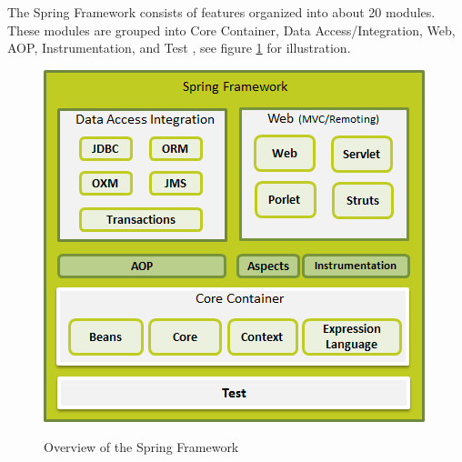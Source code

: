 The Spring Framework consists of features organized into about 20 modules. These modules are
grouped into Core Container, Data Access/Integration, Web, \ac{AOP},
Instrumentation, and Test \cite{spring-framework-reference}, see figure \ref{fig:spring_arch} for illustration.


\begin{figure}[htb]
  \centering
  \includegraphics[scale=0.6]{spring_architecture.png}\\
  \caption{Overview of the Spring Framework}
  \label{fig:spring_arch}
  \protect\cite{spring-framework-reference}
\end{figure}






